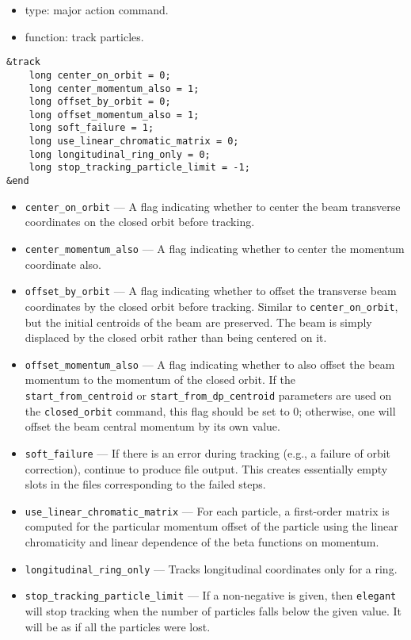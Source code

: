 \documentclass[11pt]{article}
\begin{document}
\begin{itemize}
\item type: major action command.
\item function: track particles.
\end{itemize}

\begin{verbatim}
&track
    long center_on_orbit = 0;
    long center_momentum_also = 1;
    long offset_by_orbit = 0;
    long offset_momentum_also = 1;
    long soft_failure = 1;
    long use_linear_chromatic_matrix = 0;
    long longitudinal_ring_only = 0;
    long stop_tracking_particle_limit = -1;
&end
\end{verbatim}

\begin{itemize}
\item \verb|center_on_orbit| --- A flag indicating whether to center
the beam transverse coordinates on the closed orbit before tracking.
\item \verb|center_momentum_also| --- A flag indicating whether to
center the momentum coordinate also.
\item \verb|offset_by_orbit| --- A flag indicating whether to offset
the transverse beam coordinates by the closed orbit before tracking.
Similar to \verb|center_on_orbit|, but the initial centroids of the
beam are preserved.  The beam is simply displaced by the closed orbit
rather than being centered on it.
\item \verb|offset_momentum_also| --- A flag indicating whether to also
offset the beam momentum to the momentum of the closed orbit.  If the
\verb|start_from_centroid| or \verb|start_from_dp_centroid| parameters are 
used on the \verb|closed_orbit| command, this flag should be set to
0; otherwise, one will offset the beam central momentum by its own value.
\item \verb|soft_failure| --- If there is an error during tracking (e.g.,
a failure of orbit correction), continue to produce file output.  This
creates essentially empty slots in the files corresponding to the failed
steps.
\item \verb|use_linear_chromatic_matrix| --- For each particle, a first-order
matrix is computed for the particular momentum offset 
of the particle using the linear chromaticity and linear dependence of 
the beta functions on momentum.
\item \verb|longitudinal_ring_only| --- Tracks longitudinal coordinates only
for a ring.  
\item \verb|stop_tracking_particle_limit| --- If a non-negative is given, then
{\tt elegant} will stop tracking when the number of particles falls below the
given value.  It will be as if all the particles were lost.
\end{itemize}
\end{document}
